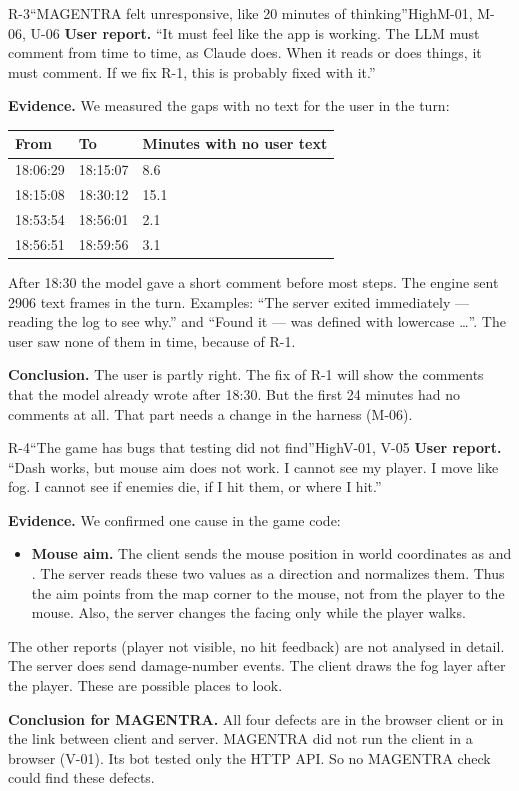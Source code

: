 \documentclass[11pt,a4paper]{article}
\newcommand{\code}[1]{\texttt{\detokenize{#1}}}
\begin{document}
\begin{findingbox}{R-3}{``MAGENTRA felt unresponsive, like 20 minutes of thinking''}{High}{M-01, M-06, U-06}
\textbf{User report.} ``It must feel like the app is working. The LLM must
comment from time to time, as Claude does. When it reads or does things, it must
comment. If we fix R-1, this is probably fixed with it.''

\textbf{Evidence.} We measured the gaps with no text for the user in the turn:
\begin{center}
\begin{tabular}{@{}lll@{}}
\toprule
From & To & Minutes with no user text \\
\midrule
18:06:29 & 18:15:07 & 8.6 \\
18:15:08 & 18:30:12 & 15.1 \\
18:53:54 & 18:56:01 & 2.1 \\
18:56:51 & 18:59:56 & 3.1 \\
\bottomrule
\end{tabular}
\end{center}
After 18:30 the model gave a short comment before most steps. The engine sent
2906 text frames in the turn. Examples: ``The server exited immediately ---
reading the log to see why.'' and ``Found it --- \code{CarveCorridor} was
defined with lowercase \code{self}\ldots''. The user saw none of them in time,
because of R-1.

\textbf{Conclusion.} The user is partly right. The fix of R-1 will show the
comments that the model already wrote after 18:30. But the first 24 minutes had
no comments at all. That part needs a change in the harness (M-06).
\end{findingbox}

\begin{findingbox}{R-4}{``The game has bugs that testing did not find''}{High}{V-01, V-05}
\textbf{User report.} ``Dash works, but mouse aim does not work. I cannot see my
player. I move like fog. I cannot see if enemies die, if I hit them, or where I
hit.''

\textbf{Evidence.} We confirmed one cause in the game code:
\begin{itemize}
  \item \textbf{Mouse aim.} The client sends the mouse position in world
        coordinates as \code{AimX} and \code{AimY}. The server reads these two
        values as a direction and normalizes them. Thus the aim points from the
        map corner to the mouse, not from the player to the mouse. Also, the
        server changes the facing only while the player walks.
\end{itemize}
The other reports (player not visible, no hit feedback) are not analysed in
detail. The server does send damage-number events. The client draws the fog
layer after the player. These are possible places to look.

\textbf{Conclusion for MAGENTRA.} All four defects are in the browser client or
in the link between client and server. MAGENTRA did not run the client in a
browser (V-01). Its bot tested only the HTTP API. So no MAGENTRA check could find
these defects.
\end{findingbox}
\end{document}

